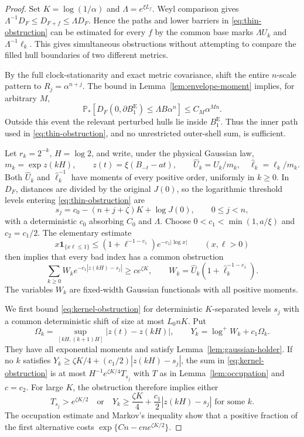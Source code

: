 \documentclass[11pt,reqno]{amsart}
\theoremstyle{plain}
\theoremstyle{definition}
\theoremstyle{remark}
\newcommand{\Pp}{\mathbb P}
\newcommand{\1}{\mathbf{1}}
\newcommand{\Be}{B^{\mathrm E}}
\begin{document}
\begin{proof}
Set $K=\log(1/\alpha)$ and $\Lambda=e^{\xi L_f}$. Weyl comparison gives $\Lambda^{-1}D_F\le D_{F+f}\le\Lambda D_F$. Hence the paths and lower barriers in \eqref{eq:thin-obstruction} can be estimated for every $f$ by the common base marks $\Lambda U_k$ and $\Lambda^{-1}\ell_k$. This gives simultaneous obstructions without attempting to compare the filled hull boundaries of two different metrics.

By the full clock-stationarity and exact metric covariance, shift the entire $n$-scale pattern to $R_j=\alpha^{n+j}$. The bound in Lemma~\ref{lem:envelope-moment} implies, for arbitrary $M$,
\[
\Pp_*[D_F(0,\partial\Be_1)\le\Lambda B\alpha^n]\le C_M\alpha^{Mn}.
\]
Outside this event the relevant perturbed hulls lie inside $\Be_1$. Thus the inner path used in \eqref{eq:thin-obstruction}, and no unrestricted outer-shell sum, is sufficient.

Let $r_k=2^{-k}$, $H=\log 2$, and write, under the physical Gaussian law,
\[
m_k=\exp z(kH),\qquad z(t)=\xi(B_{-t}-at),\qquad
\widehat U_k=U_k/m_k,\quad\widehat\ell_k=\ell_k/m_k.
\]
Both $\widehat U_k$ and $\widehat\ell_k^{-1}$ have moments of every positive order, uniformly in $k\ge0$. In $D_F$, distances are divided by the original $J(0)$, so the logarithmic threshold levels entering \eqref{eq:thin-obstruction} are
\[
s_j=c_0-(n+j+\zeta)K+\log J(0),\qquad 0\le j<n,
\]
with a deterministic $c_0$ absorbing $C_0$ and $\Lambda$. Choose $0<c_1<\min(1,a/\xi)$ and $c_2=c_1/2$. The elementary estimate
\[
x\1_{\{x\ell\le1\}}\le (1+\ell^{-1-c_1})e^{-c_1|\log x|}\qquad(x,\ell>0)
\]
then implies that every bad index has a common obstruction
\begin{equation}\label{eq:kernel-obstruction}
\sum_{k\ge0}W_ke^{-c_1|z(kH)-s_j|}\ge c e^{\zeta K},
\qquad W_k=\widehat U_k(1+\widehat\ell_k^{-1-c_1}).
\end{equation}
The variables $W_k$ are fixed-width Gaussian functionals with all positive moments.

We first bound \eqref{eq:kernel-obstruction} for deterministic $K$-separated levels $s_j$ with a common deterministic shift of size at most $L_0nK$. Put
\[
\Omega_k=\sup_{[kH,(k+1)H]}|z(t)-z(kH)|,\qquad
Y_k=\log^+W_k+c_1\Omega_k.
\]
They have all exponential moments and satisfy Lemma~\ref{lem:gaussian-holder}. If no $k$ satisfies $Y_k\ge\zeta K/4+(c_1/2)|z(kH)-s_j|$, the sum in \eqref{eq:kernel-obstruction} is at most
$H^{-1}e^{\zeta K/4}T_{s_j}$ with $T$ as in Lemma~\ref{lem:occupation} and $c=c_2$. For large $K$, the obstruction therefore implies either
\begin{equation}\label{eq:two-bad-mechanisms}
T_{s_j}>e^{\zeta K/2}\quad\text{or}\quad
Y_k\ge\frac{\zeta K}{4}+\frac{c_1}2|z(kH)-s_j|\text{ for some }k.
\end{equation}
The occupation estimate and Markov's inequality show that a positive fraction of the first alternative costs $\exp\{Cn-cne^{\zeta K/2}\}$.


\end{proof}
\end{document}
